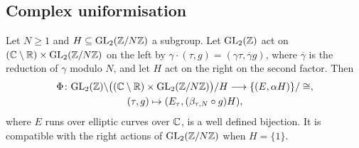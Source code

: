 
\subsection{Complex uniformisation}

\begin{proposition}
\label{prop:complex-uniformisation}
Let $N \geq 1$ and $H \subseteq \GL{2}{\ResidueRing{N}}$ a subgroup. Let
$\GL{2}{\ZZ}$ act on $(\SlitPlane) \times \GL{2}{\ResidueRing{N}}$ on the
left by $\gamma\cdot(\tau, g) = (\gamma\tau, \overline{\gamma} g)$, where
$\overline{\gamma}$ is the reduction of $\gamma$ modulo $N$, and let $H$
act on the right on the second factor. Then
\begin{gather*}
  \Phi \colon \GL{2}{\ZZ}\backslash\bigl((\SlitPlane)\times\GL{2}{\ResidueRing{N}}\bigr)/H
  \longrightarrow
  \{(E, \LevelClass{\LevelStructure}{H})\}/\cong,\\
  (\tau, g) \mapsto (\EllCurve{\tau}, \LevelClass{(\StdLevel{\tau}{N}\circ g)}{H}),
\end{gather*}
where $E$ runs over elliptic curves over $\mathbb{C}$, is a well defined
bijection. It is compatible with the right actions of
$\GL{2}{\ResidueRing{N}}$ when $H = \{1\}$.
\end{proposition}

